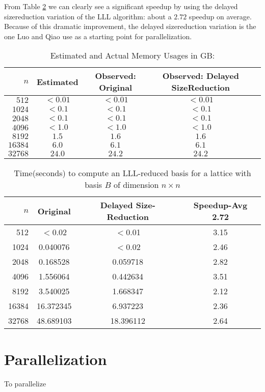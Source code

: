 \documentclass[12pt]{article}
\numberwithin{equation}{section}
\numberwithin{table}{section}
\numberwithin{figure}{section}
\begin{document}
From Table \ref{serialtimes} we can clearly see a significant speedup by using the delayed size\-reduction variation of the LLL algorithm: about a $2.72$ speedup on average. Because of this dramatic improvement, the delayed size\-reduction variation is the one Luo and Qiao use as a starting point for parallelization.
\begin{table} \centering
  \caption{Estimated and Actual Memory Usages in GB:}
  \label{memusage}
  \vspace{0.5\baselineskip}
  \begin{tabular}{rcccc}
    \hline
    $n$ & Estimated & Observed: Original & Observed: Delayed Size\-Reduction\\
    \hline
       $512$ & $<0.01$ & $<0.01$ & $<0.01$ \\
      $1024$ & $<0.1$  & $<0.1$  & $<0.1$  \\
      $2048$ & $<0.1$  & $<0.1$  & $<0.1$  \\
      $4096$ & $<1.0$  & $<1.0$  & $<1.0$  \\
      $8192$ & $1.5 $  & $1.6 $  & $1.6 $  \\
     $16384$ & $6.0 $  & $6.1 $  & $6.1 $  \\
     $32768$ & $24.0$  & $24.2$  & $24.2$  \\
    \hline
  \end{tabular}
\end{table}
\begin{table} \centering
  \caption{Time(seconds) to compute an LLL-reduced basis for a lattice with basis $B$ of dimension $n\times n$}
  \label{serialtimes}
  \vspace{0\baselineskip}
  \begin{tabular}{rccc}
    \hline
    $n$ & Original & Delayed Size-Reduction & Speedup-Avg 2.72\\
    \hline
      512 & $<$0.02   & $<$0.01   & 3.15 \\
     1024 & 0.040076  & $<$0.02   & 2.46 \\
     2048 & 0.168528  & 0.059718  & 2.82 \\
     4096 & 1.556064  & 0.442634  & 3.51 \\
     8192 & 3.540025  & 1.668347  & 2.12 \\
    16384 & 16.372345 & 6.937223  & 2.36 \\
    32768 & 48.689103 & 18.396112 & 2.64 \\
    \hline                          
  \end{tabular}
\end{table}

\section{Parallelization}
To parallelize 

\pagebreak

\end{document}
